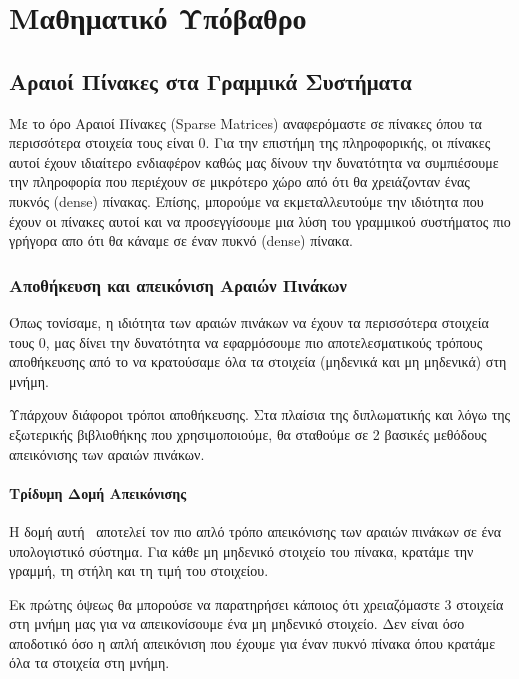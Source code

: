 ﻿\chapter{Μαθηματικό Υπόβαθρο}
\label{ch:3.chapterMathBackground}

\section{Αραιοί Πίνακες στα Γραμμικά Συστήματα}

Με το όρο Αραιοί Πίνακες \textlatin{(Sparse Matrices)} αναφερόμαστε σε πίνακες όπου τα περισσότερα στοιχεία τους είναι 0. Για την επιστήμη της πληροφορικής, οι πίνακες αυτοί έχουν ιδιαίτερο ενδιαφέρον καθώς μας δίνουν την δυνατότητα να συμπιέσουμε την πληροφορία που περιέχουν σε μικρότερο χώρο από ότι θα χρειάζονταν ένας πυκνός \textlatin{(dense)} πίνακας. Επίσης, μπορούμε να εκμεταλλευτούμε την ιδιότητα που έχουν οι πίνακες αυτοί και να προσεγγίσουμε μια λύση του γραμμικού συστήματος πιο γρήγορα απο ότι θα κάναμε σε έναν πυκνό \textlatin{(dense)} πίνακα.

\subsection{Αποθήκευση και απεικόνιση Αραιών Πινάκων}

Όπως τονίσαμε, η ιδιότητα των αραιών πινάκων να έχουν τα περισσότερα στοιχεία τους 0, μας δίνει την δυνατότητα να εφαρμόσουμε πιο αποτελεσματικούς τρόπους αποθήκευσης από το να κρατούσαμε όλα τα στοιχεία (μηδενικά και μη μηδενικά) στη μνήμη.

Υπάρχουν διάφοροι τρόποι αποθήκευσης. Στα πλαίσια της διπλωματικής και λόγω της εξωτερικής βιβλιοθήκης που χρησιμοποιούμε, θα σταθούμε σε 2 βασικές μεθόδους απεικόνισης των αραιών πινάκων.

\subsubsection{Τρίδυμη Δομή Απεικόνισης} \label{TripletForm}
Η δομή αυτή~\cite{davis2006direct} αποτελεί τον πιο απλό τρόπο απεικόνισης των αραιών πινάκων σε ένα υπολογιστικό σύστημα. Για κάθε μη μηδενικό στοιχείο του πίνακα, κρατάμε την γραμμή, τη στήλη και τη τιμή του στοιχείου.

Εκ πρώτης όψεως θα μπορούσε να παρατηρήσει κάποιος ότι χρειαζόμαστε 3 στοιχεία στη μνήμη μας για να απεικονίσουμε ένα μη μηδενικό στοιχείο. Δεν είναι όσο αποδοτικό όσο η απλή απεικόνιση που έχουμε για έναν πυκνό πίνακα όπου κρατάμε όλα τα στοιχεία στη μνήμη.

